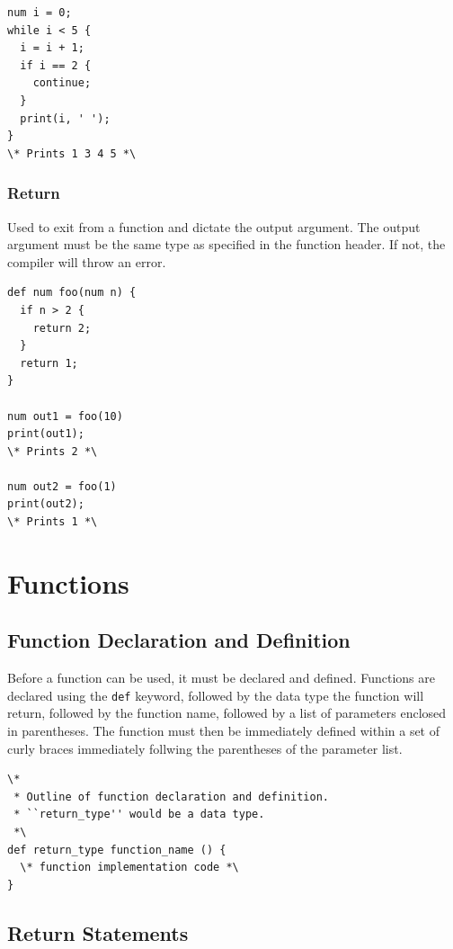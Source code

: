 \documentclass{article}
\newcommand{\code}[1]{\texttt{#1}} %
\begin{document}
\begin{lstlisting}[language=pltLang, label=lst:continue-statement]
num i = 0;
while i < 5 {
  i = i + 1;
  if i == 2 {
    continue;
  }
  print(i, ' ');
}
\* Prints 1 3 4 5 *\

\end{lstlisting}

\subsubsection{Return}
Used to exit from a function and dictate the output argument. The output argument must be the same type as specified in the function header. If not, the compiler will throw an error.

\begin{lstlisting}[language=pltLang, label=lst:return-statement]
def num foo(num n) {
  if n > 2 {
    return 2;
  }
  return 1;
} 

num out1 = foo(10)
print(out1);
\* Prints 2 *\

num out2 = foo(1)
print(out2);
\* Prints 1 *\
\end{lstlisting}


\section{Functions}

\subsection{Function Declaration and Definition}

Before a function can be used, it must be declared and defined. Functions are declared using the \code{def} keyword, followed by the data type the function will return, followed by the function name, followed by a list of parameters enclosed in parentheses. The function must then be immediately defined within a set of curly braces immediately follwing the parentheses of the parameter list. 

\begin{lstlisting}[language=pltLang, caption=Function declaration and definition., label=lst:funct-def]
\* 
 * Outline of function declaration and definition.
 * ``return_type'' would be a data type.
 *\
def return_type function_name () {
  \* function implementation code *\
}
\end{lstlisting}

\subsection{Return Statements}
\end{document}
